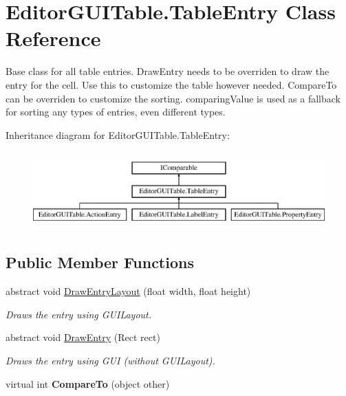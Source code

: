 \hypertarget{class_editor_g_u_i_table_1_1_table_entry}{}\section{Editor\+G\+U\+I\+Table.\+Table\+Entry Class Reference}
\label{class_editor_g_u_i_table_1_1_table_entry}


Base class for all table entries. Draw\+Entry needs to be overriden to draw the entry for the cell. Use this to customize the table however needed. Compare\+To can be overriden to customize the sorting. comparing\+Value is used as a fallback for sorting any types of entries, even different types.  


Inheritance diagram for Editor\+G\+U\+I\+Table.\+Table\+Entry\+:\begin{figure}[H]
\begin{center}
\leavevmode
\includegraphics[height=2.994653cm]{class_editor_g_u_i_table_1_1_table_entry}
\end{center}
\end{figure}
\subsection*{Public Member Functions}
\begin{DoxyCompactItemize}
\item 
abstract void \mbox{\hyperlink{class_editor_g_u_i_table_1_1_table_entry_abe1e2747e56d50731eeec28635b366a1}{Draw\+Entry\+Layout}} (float width, float height)
\begin{DoxyCompactList}\small\item\em Draws the entry using G\+U\+I\+Layout. \end{DoxyCompactList}\item 
abstract void \mbox{\hyperlink{class_editor_g_u_i_table_1_1_table_entry_ae02e641122da6dd161d61a20576812ca}{Draw\+Entry}} (Rect rect)
\begin{DoxyCompactList}\small\item\em Draws the entry using G\+UI (without G\+U\+I\+Layout). \end{DoxyCompactList}\item 
\mbox{\label{class_editor_g_u_i_table_1_1_table_entry_a6545f137420db34b649873ff8d7b7b51}} 
virtual int {\bfseries Compare\+To} (object other)
\end{DoxyCompactItemize}
